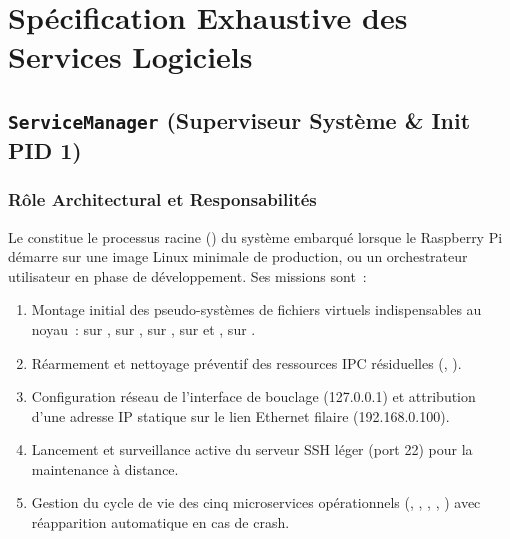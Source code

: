 \chapter{Spécification Exhaustive des Services Logiciels}
\label{chap:services}

\section{\texorpdfstring{\texttt{ServiceManager}}{ServiceManager} (Superviseur Système \& Init PID 1)}

\subsection{Rôle Architectural et Responsabilités}
Le  constitue le processus racine () du système embarqué lorsque le Raspberry Pi démarre sur une image Linux minimale de production, ou un orchestrateur utilisateur en phase de développement. Ses missions sont~:
\begin{enumerate}
    \item Montage initial des pseudo-systèmes de fichiers virtuels indispensables au noyau~:  sur ,  sur ,  sur ,  sur  et ,  sur .
    \item Réarmement et nettoyage préventif des ressources IPC résiduelles (, ).
    \item Configuration réseau de l'interface de bouclage  (127.0.0.1) et attribution d'une adresse IP statique sur le lien Ethernet filaire  (192.168.0.100).
    \item Lancement et surveillance active du serveur SSH léger  (port 22) pour la maintenance à distance.
    \item Gestion du cycle de vie des cinq microservices opérationnels (, , , , ) avec réapparition automatique en cas de crash.
\end{enumerate}


